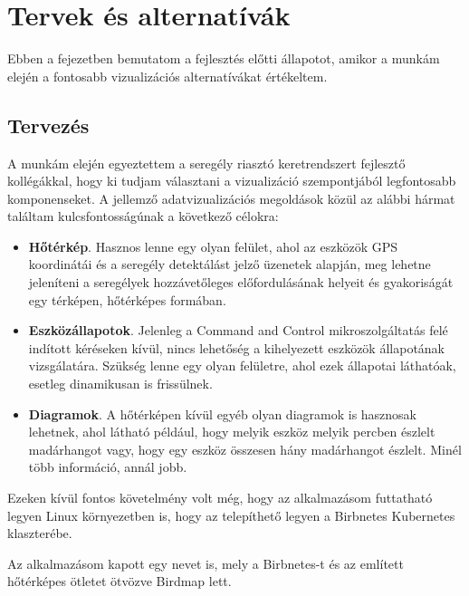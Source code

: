 \chapter{Tervek és alternatívák}
\label{chapt:birdmap-introduction}
Ebben a fejezetben bemutatom a fejlesztés előtti állapotot, amikor a munkám elején a fontosabb vizualizációs alternatívákat értékeltem.

\section{Tervezés}
A munkám elején egyeztettem a seregély riasztó keretrendszert fejlesztő kollégákkal, 
hogy ki tudjam választani a vizualizáció szempontjából legfontosabb komponenseket.
A jellemző adatvizualizációs megoldások közül az alábbi hármat találtam kulcsfontosságúnak a következő célokra:
\begin{itemize}
    \item \textbf{Hőtérkép}. Hasznos lenne egy olyan felület, ahol az eszközök GPS koordinátái és a seregély detektálást jelző üzenetek alapján, meg lehetne jeleníteni a seregélyek hozzávetőleges előfordulásának helyeit és gyakoriságát egy térképen, hőtérképes formában.
    \item \textbf{Eszközállapotok}. Jelenleg a Command and Control mikroszolgáltatás felé indított kéréseken kívül, nincs lehetőség a kihelyezett eszközök állapotának vizsgálatára. Szükség lenne egy olyan felületre, ahol ezek állapotai láthatóak, esetleg dinamikusan is frissülnek.
    \item \textbf{Diagramok}. A hőtérképen kívül egyéb olyan diagramok is hasznosak lehetnek, ahol látható például, hogy melyik eszköz melyik percben észlelt madárhangot vagy, hogy egy eszköz összesen hány madárhangot észlelt. Minél több információ, annál jobb.
\end{itemize}
Ezeken kívül fontos követelmény volt még, hogy az alkalmazásom futtatható legyen Linux környezetben is, hogy az telepíthető legyen a Birbnetes Kubernetes \cite{kubernetes} klaszterébe.

Az alkalmazásom kapott egy nevet is, mely a Birbnetes-t és az említett hőtérképes ötletet ötvözve Birdmap lett.
